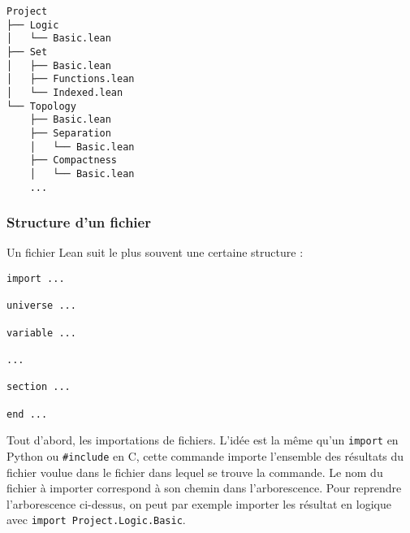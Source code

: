 \documentclass[a4paper, 12pt]{article}
\newcommand{\lean}[1]{\texttt{#1}}
\begin{document}
\newpage
\begin{verbatim}
Project
├── Logic
│   └── Basic.lean
├── Set
│   ├── Basic.lean
│   ├── Functions.lean
│   └── Indexed.lean
└── Topology
    ├── Basic.lean
    ├── Separation
    │   └── Basic.lean
    ├── Compactness
    │   └── Basic.lean
    ...
\end{verbatim}

\subsubsection{Structure d'un fichier}

Un fichier Lean suit le plus souvent une certaine structure :

\begin{verbatim}
import ...

universe ...

variable ...

...

section ...

end ...
\end{verbatim}

Tout d'abord, les importations de fichiers. L'idée est la même qu'un \texttt{import} en Python ou \texttt{#include} en C, cette commande importe l'ensemble des résultats du fichier voulue dans le fichier dans lequel se trouve la commande. Le nom du fichier à importer correspond à son chemin dans l'arborescence. Pour reprendre l'arborescence ci-dessus, on peut par exemple importer les résultat en logique avec \lean{import Project.Logic.Basic}.
\end{document}

